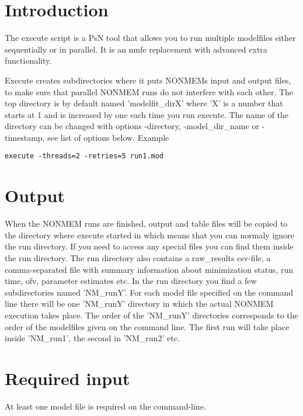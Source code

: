 




\maketitle
\newcommand{\guidetoolname}{execute}


\section{Introduction}
The execute script is a PsN tool that allows you to run multiple modelfiles either sequentially or in parallel. It is an nmfe replacement with advanced extra
functionality.

Execute creates subdirectories where it puts NONMEMs input and output files, to make sure that parallel NONMEM runs do not interfere with each other.
The top directory is by default named 'modelfit\_dirX' where 'X' is a number that starts at 1 and is increased by one each time you run execute. The name of the directory can be changed with options -directory, -model\_dir\_name or -timestamp, see list of options below.
Example
\begin{verbatim}
execute -threads=2 -retries=5 run1.mod 
\end{verbatim}

\section{Output}
When the NONMEM runs are finished, output and table files will be copied to the directory where execute started in which means that you can normaly ignore the 
run directory. If you need to access any special files you can find them inside
the run directory. The run directory also contains a raw\_results csv-file,
a comma-separated file with summary information about
minimization status, run time, ofv, parameter estimates etc.
In the run directory you find a few subdirectories named 'NM\_runY'. For each model file specified on the command line there will be one 'NM\_runY' directory in which the actual NONMEM execution takes place. 
The order of the 'NM\_runY' directories corresponds to the order of the 
modelfiles given on the command line. The first run will take place inside 'NM\_run1', the second in 'NM\_run2' etc.

\section{Required input}
At least one model file is required on the command-line. 



